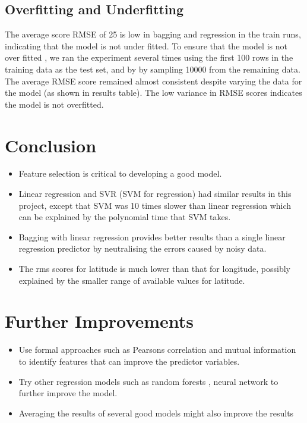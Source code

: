 \subsection{Overfitting and Underfitting}
The average score  RMSE of 25 is low in bagging and regression in the train runs, indicating that the model is not under fitted. To ensure that the model is not over fitted , we ran the experiment several times using the first 100 rows in the training data as the test set, and by by sampling  10000 from the remaining data. The average RMSE score remained almost consistent despite varying the data for the model (as shown in results table). The low variance in RMSE scores  indicates the model is not overfitted. 

\section{Conclusion}
\begin{itemize}
\item Feature selection is critical to developing a good model.
\item Linear regression and SVR (SVM for regression) had similar results in this project, except that SVM was 10 times slower than linear regression which can be explained by the polynomial time that SVM takes.
\item Bagging with linear regression provides better results than a single linear regression predictor by neutralising the errors caused by noisy data.
\item The rms scores for latitude is much lower than that for longitude, possibly explained by the smaller range of available values for latitude.
\end{itemize}

\section{Further Improvements}
\begin{itemize}
\item Use formal approaches such as Pearsons correlation and mutual information to identify features that can improve the predictor variables.
\item Try other regression models such as random forests , neural network to further improve the model.
\item Averaging the results of several good models might also improve the results
\end{itemize}
